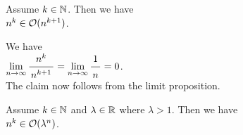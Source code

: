 \example
Assume $k \in {\mathbb N}$.  Then we have
\\[0.2cm]
\hspace*{1.3cm}
 $n^k \in \mathcal{O}(n^{k+1})$.
\ex
 
\proof
We have \\[0.2cm]
\hspace*{1.3cm} 
$\lim\limits_{n \rightarrow \infty} \bruch{n^{k}}{n^{k+1}} = \lim\limits_{n \rightarrow   \infty} \bruch{1}{n} = 0$.
\\[0.2cm]
The claim now follows from the limit proposition. 
\qeds

\example
Assume $k \in {\mathbb N}$ and $\lambda \in {\mathbb R}$ where $\lambda > 1$.  Then we have \\[0.2cm]
\hspace*{1.3cm} $n^k \in \mathcal{O}(\lambda^n)$.
\ex

